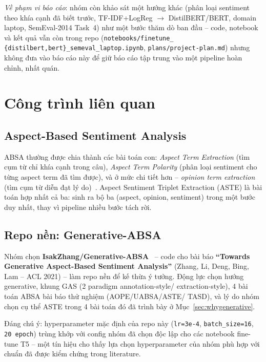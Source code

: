 \documentclass[11pt,a4paper]{article}
\begin{document}
\emph{Về phạm vi báo cáo}: nhóm còn khảo sát một hướng khác (phân loại
sentiment theo khía cạnh đã biết trước, TF-IDF+LogReg $\to$ DistilBERT/BERT,
domain laptop, SemEval-2014 Task~4) như một bước thăm dò ban đầu -- code,
notebook và kết quả vẫn còn trong repo (\texttt{notebooks/finetune\_%
\{distilbert,bert\}\_semeval\_laptop.ipynb}, \texttt{plans/\allowbreak project-\allowbreak plan.md})
nhưng không đưa vào báo cáo này để giữ báo cáo tập trung vào một pipeline
hoàn chỉnh, nhất quán.


\clearpage
\section{Công trình liên quan}

\subsection{Aspect-Based Sentiment Analysis}

ABSA thường được chia thành các bài toán con: \emph{Aspect Term Extraction}
(tìm cụm từ chỉ khía cạnh trong câu), \emph{Aspect Term Polarity} (phân loại
sentiment cho từng aspect term đã tìm được), và ở mức chi tiết hơn --
\emph{opinion term extraction} (tìm cụm từ diễn đạt lý do)~\cite{semeval2014}.
Aspect Sentiment Triplet Extraction (ASTE) là bài toán hợp nhất cả ba: sinh ra
bộ ba (aspect, opinion, sentiment) trong một bước duy nhất, thay vì pipeline
nhiều bước tách rời.

\subsection{Repo nền: Generative-ABSA}

Nhóm chọn \textbf{IsakZhang/Generative-ABSA}~\cite{genabsa} -- code cho bài
báo \textbf{``Towards Generative Aspect-Based Sentiment Analysis''} (Zhang,
Li, Deng, Bing, Lam -- ACL 2021) -- làm repo nền để kế thừa ý tưởng. Động
lực chọn hướng generative, khung GAS (2 paradigm annotation-style/
extraction-style), 4 bài toán ABSA bài báo thử nghiệm (AOPE/UABSA/ASTE/
TASD), và lý do nhóm chọn cụ thể ASTE trong 4 bài toán đó đã trình bày ở
Mục~\ref{sec:whygenerative}.

Đáng chú ý: hyperparameter mặc định của repo này (\texttt{lr=3e-4},
\texttt{batch\_size=16}, \texttt{20 epoch}) trùng khớp với config nhóm đã
chọn độc lập cho các notebook fine-tune T5 -- một tín hiệu cho thấy lựa
chọn hyperparameter của nhóm phù hợp với chuẩn đã được kiểm chứng trong
literature.
\end{document}
